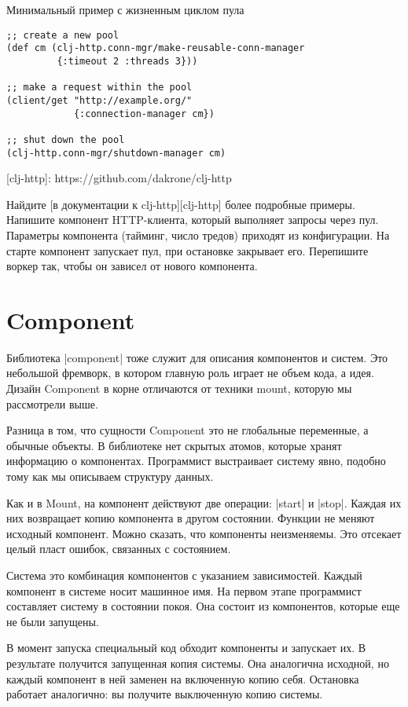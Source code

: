 Минимальный пример с жизненным циклом пула

\begin{verbatim}
;; create a new pool
(def cm (clj-http.conn-mgr/make-reusable-conn-manager
         {:timeout 2 :threads 3}))

;; make a request within the pool
(client/get "http://example.org/"
            {:connection-manager cm})

;; shut down the pool
(clj-http.conn-mgr/shutdown-manager cm)
\end{verbatim}

[clj-http]: https://github.com/dakrone/clj-http

Найдите [в документации к clj-http][clj-http] более подробные примеры. Напишите
компонент HTTP-клиента, который выполняет запросы через пул. Параметры
компонента (тайминг, число тредов) приходят из конфигурации. На старте компонент
запускает пул, при остановке закрывает его. Перепишите воркер так, чтобы он
зависел от нового компонента.

\section{Component}

Библиотека \spverb|component|
тоже служит для описания компонентов и систем. Это небольшой фремворк, в котором
главную роль играет не объем кода, а идея. Дизайн Component в корне отличаются
от техники mount, которую мы рассмотрели выше.

Разница в том, что сущности Component это не глобальные переменные, а обычные
объекты. В библиотеке нет скрытых атомов, которые хранят информацию о
компонентах. Программист выстраивает систему явно, подобно тому как мы описываем
структуру данных.

Как и в Mount, на компонент действуют две операции: \spverb|start| и \spverb|stop|. Каждая их
них возвращает копию компонента в другом состоянии. Функции не меняют исходный
компонент. Можно сказать, что компоненты неизменяемы. Это отсекает целый пласт
ошибок, связанных с состоянием.

Система это комбинация компонентов с указанием зависимостей. Каждый компонент в
системе носит машинное имя. На первом этапе программист составляет систему в
состоянии покоя. Она состоит из компонентов, которые еще не были запущены.

В момент запуска специальный код обходит компоненты и запускает их. В результате
получится запущенная копия системы. Она аналогична исходной, но каждый компонент
в ней заменен на включенную копию себя. Остановка работает аналогично: вы
получите выключенную копию системы.


